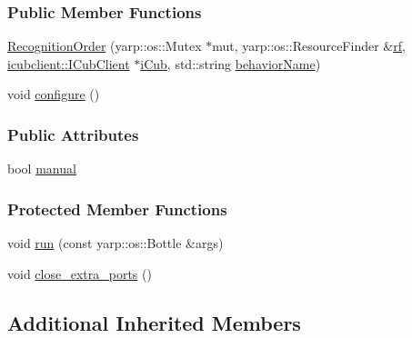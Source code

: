 \subsubsection*{Public Member Functions}
\begin{DoxyCompactItemize}
\item 
\hyperlink{group__behaviorManager_a465b3e91f617df73f606e4ec24c6e12b}{Recognition\+Order} (yarp\+::os\+::\+Mutex $\ast$mut, yarp\+::os\+::\+Resource\+Finder \&\hyperlink{group__behaviorManager_a789254580a094846e91a9892fa2bc4cd}{rf}, \hyperlink{group__icubclient__clients_classicubclient_1_1ICubClient}{icubclient\+::\+I\+Cub\+Client} $\ast$\hyperlink{group__behaviorManager_a5ab3f49bb3a40d79fe2b4aeb76e12196}{i\+Cub}, std\+::string \hyperlink{group__behaviorManager_aad9d5bf2f1f1e9c6902a4f40b03c4e67}{behavior\+Name})
\item 
void \hyperlink{group__behaviorManager_a617221425cec2b16576e02797b788b9f}{configure} ()
\end{DoxyCompactItemize}
\subsubsection*{Public Attributes}
\begin{DoxyCompactItemize}
\item 
bool \hyperlink{group__behaviorManager_a8c7cf2790adc7f55a3013450659973f8}{manual}
\end{DoxyCompactItemize}
\subsubsection*{Protected Member Functions}
\begin{DoxyCompactItemize}
\item 
void \hyperlink{group__behaviorManager_a0a095aa1af770bac92f30042cee21e3a}{run} (const yarp\+::os\+::\+Bottle \&args)
\item 
void \hyperlink{group__behaviorManager_aa5b70feb16d8c7b5eb883f503c96f9fa}{close\+\_\+extra\+\_\+ports} ()
\end{DoxyCompactItemize}
\subsection*{Additional Inherited Members}


